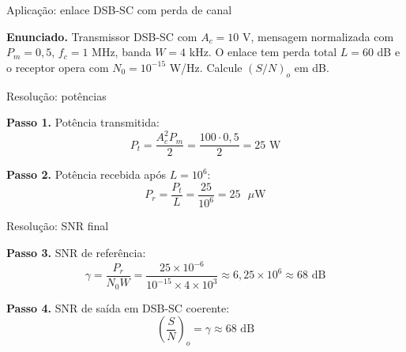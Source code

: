 \begin{frame}{Aplicação: enlace DSB-SC com perda de canal}

\textbf{Enunciado.} Transmissor DSB-SC com $A_c = 10$ V, mensagem normalizada com $P_m = 0{,}5$, $f_c = 1$ MHz, banda $W = 4$ kHz. O enlace tem perda total $L = 60$ dB e o receptor opera com $N_0 = 10^{-15}$ W/Hz. Calcule $(S/N)_o$ em dB.

\begin{center}
\end{center}

\end{frame}


\begin{frame}{Resolução: potências}

\textbf{Passo 1.} Potência transmitida:
\[
P_t = \frac{A_c^2 P_m}{2} = \frac{100 \cdot 0{,}5}{2} = 25 \text{ W}
\]

\textbf{Passo 2.} Potência recebida após $L = 10^6$:
\[
P_r = \frac{P_t}{L} = \frac{25}{10^{6}} = 25 \text{ } \mu\text{W}
\]

\end{frame}


\begin{frame}{Resolução: SNR final}

\textbf{Passo 3.} SNR de referência:
\[
\gamma = \frac{P_r}{N_0 W} = \frac{25 \times 10^{-6}}{10^{-15} \times 4 \times 10^{3}} \approx 6{,}25 \times 10^{6} \approx 68 \text{ dB}
\]

\textbf{Passo 4.} SNR de saída em DSB-SC coerente:
\[
\left(\frac{S}{N}\right)_o = \gamma \approx 68 \text{ dB}
\]

\end{frame}

